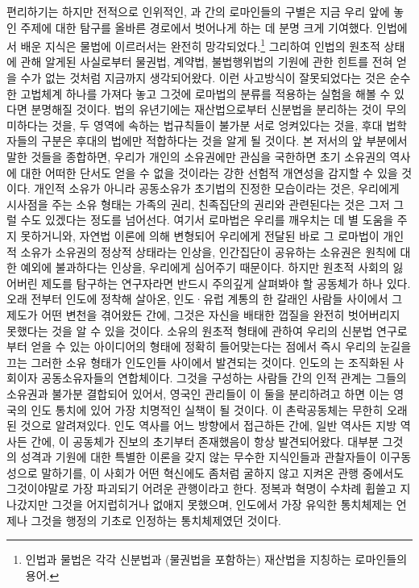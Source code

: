 편리하기는 하지만 전적으로 인위적인,
과  간의
로마인들의 구별은
지금 우리 앞에 놓인 주제에 대한 탐구를 올바른 경로에서
벗어나게 하는 데 분명 크게 기여했다.
인법에서 배운 지식은
물법에 이르러서는 완전히 망각되었다.\footnote{%
  인법과 물법은 각각 신분법과 (물권법을 포함하는) 재산법을 지칭하는
  로마인들의 용어.
  }
그리하여
인법의 원초적 상태에 관해 알게된 사실로부터
물권법, 계약법, 불법행위법의 기원에 관한 힌트를 전혀 얻을 수가 없는 것처럼
지금까지 생각되어왔다.
이런 사고방식이 잘못되었다는 것은
순수한 고법체계 하나를 가져다 놓고
그것에 로마법의 분류를 적용하는 실험을 해볼 수 있다면
분명해질 것이다.
법의 유년기에는
재산법으로부터 신분법을 분리하는 것이 무의미하다는 것을,
두 영역에 속하는 법규칙들이 불가분 서로 엉켜있다는 것을,
후대 법학자들의 구분은 후대의 법에만 적합하다는 것을
알게 될 것이다.
본 저서의 앞 부분에서 말한 것들을 종합하면,
우리가 개인의 소유권에만 관심을 국한하면
초기 소유권의 역사에 대한 어떠한 단서도 얻을 수 없을 것이라는
강한 선험적 개연성을 감지할 수 있을 것이다.
개인적 소유가 아니라 공동소유가 초기법의 진정한 모습이라는 것은,
우리에게 시사점을 주는 소유 형태는 가족의 권리, 친족집단의 권리와
관련된다는 것은 그저 그럴 수도 있겠다는 정도를 넘어선다.
여기서 로마법은 우리를 깨우치는 데 별 도움을 주지 못하거니와,
자연법 이론에 의해 변형되어
우리에게 전달된 바로 그 로마법이
개인적 소유가 소유권의 정상적 상태라는 인상을,
인간집단이 공유하는 소유권은 원칙에 대한 예외에 불과하다는 인상을,
우리에게 심어주기 때문이다.
하지만 원초적 사회의 잃어버린 제도를 탐구하는 연구자라면
반드시 주의깊게 살펴봐야 할 공동체가 하나 있다.
오래 전부터 인도에 정착해 살아온,
인도^^b7유럽 계통의 한 갈래인 사람들 사이에서
그 제도가
어떤 변천을 겪어왔든 간에,
그것은
자신을 배태한 껍질을 완전히 벗어버리지 못했다는 것을 알 수 있을 것이다.
소유의 원초적 형태에 관하여
우리의 신분법 연구로부터
얻을 수 있는
아이디어의
형태에 정확히 들어맞는다는 점에서
즉시
우리의 눈길을 끄는 그러한 소유 형태가
인도인들 사이에서
발견되는 것이다.
인도의 는 조직화된  사회이자
공동소유자들의 연합체이다.
그것을 구성하는 사람들 간의 인적 관계는
그들의 소유권과 불가분 결합되어 있어서,
영국인 관리들이 이 둘을 분리하려고 하면 이는
영국의 인도 통치에 있어 가장 치명적인 실책이 될 것이다.
이 촌락공동체는 무한히 오래된 것으로 알려져있다.
인도 역사를 어느 방향에서 접근하든 간에,
일반 역사든 지방 역사든 간에,
이 공동체가 진보의 초기부터 존재했음이 항상 발견되어왔다.
대부분 그것의 성격과 기원에 대한 특별한 이론을 갖지 않는
무수한 지식인들과 관찰자들이
이구동성으로 말하기를,
이 사회가
어떤 혁신에도 좀처럼 굴하지 않고 지켜온 관행 중에서도
그것이야말로 가장 파괴되기 어려운 관행이라고 한다.
정복과 혁명이 수차례 휩쓸고 지나갔지만
그것을 어지럽히거나 없애지 못했으며,
인도에서 가장 유익한 통치체제는 언제나
그것을 행정의 기초로 인정하는 통치체제였던 것이다.

